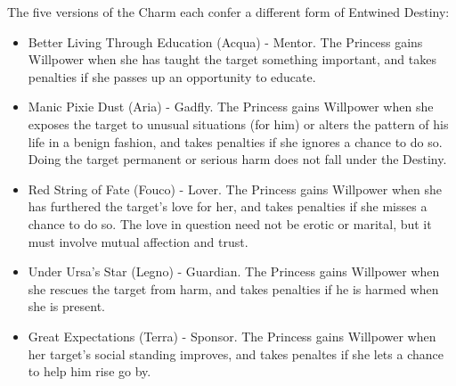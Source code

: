 The five versions of the Charm each confer a different form of Entwined Destiny:
\begin{itemize}
\item    Better Living Through Education (Acqua) - Mentor. The Princess gains Willpower when she has taught the target something important, and takes penalties if she passes up an opportunity to educate.

\item    Manic Pixie Dust (Aria) - Gadfly. The Princess gains Willpower when she exposes the target to unusual situations (for him) or alters the pattern of his life in a benign fashion, and takes penalties if she ignores a chance to do so. Doing the target permanent or serious harm does not fall under the Destiny.

\item    Red String of Fate (Fouco) - Lover. The Princess gains Willpower when she has furthered the target's love for her, and takes penalties if she misses a chance to do so. The love in question need not be erotic or marital, but it must involve mutual affection and trust.

\item    Under Ursa's Star (Legno) - Guardian. The Princess gains Willpower when she rescues the target from harm, and takes penalties if he is harmed when she is present.

\item    Great Expectations (Terra) - Sponsor. The Princess gains Willpower when her target's social standing improves, and takes penaltes if she lets a chance to help him rise go by. 
 \end{itemize}

